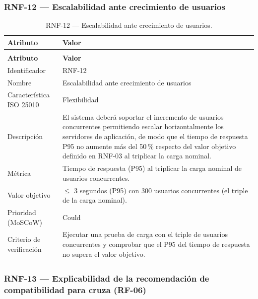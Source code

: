 \documentclass[journal,onecolumn]{IEEEtran}
\makeatletter
\newenvironment{atributos}[2]{%
	\small
	\begin{longtable}{@{}>{\raggedright\arraybackslash}p{4.2cm} >{\raggedright\arraybackslash}p{11.2cm}@{}}
		\caption{#2}\label{tab:#1}\\
		\toprule
		\textbf{Atributo} & \textbf{Valor} \\
		\midrule
		\endfirsthead
		\multicolumn{2}{@{}l}{\small\itshape (continuación)}\\
		\toprule
		\textbf{Atributo} & \textbf{Valor} \\
		\midrule
		\endhead
		\bottomrule
		\endlastfoot
	}{%
	\end{longtable}
	\normalsize
}
\makeatother
\begin{document}
	\subsubsection{RNF-12 --- Escalabilidad ante crecimiento de usuarios}
	
	\begin{atributos}{RNF-12}{RNF-12 --- Escalabilidad ante crecimiento de usuarios.}
		Identificador & RNF-12 \\
		Nombre & Escalabilidad ante crecimiento de usuarios \\
		Característica ISO 25010 & Flexibilidad \\
		Descripción & El sistema deberá soportar el incremento de usuarios concurrentes permitiendo escalar horizontalmente los servidores de aplicación, de modo que el tiempo de respuesta P95 no aumente más del 50\,\% respecto del valor objetivo definido en RNF-03 al triplicar la carga nominal. \\
		Métrica & Tiempo de respuesta (P95) al triplicar la carga nominal de usuarios concurrentes. \\
		Valor objetivo & $\leq$ 3 segundos (P95) con 300 usuarios concurrentes (el triple de la carga nominal). \\
		Prioridad (MoSCoW) & Could \\
		Criterio de verificación & Ejecutar una prueba de carga con el triple de usuarios concurrentes y comprobar que el P95 del tiempo de respuesta no supera el valor objetivo. \\
	\end{atributos}
	
	\subsubsection{RNF-13 --- Explicabilidad de la recomendación de compatibilidad para cruza (RF-06)}
	
\end{document}
